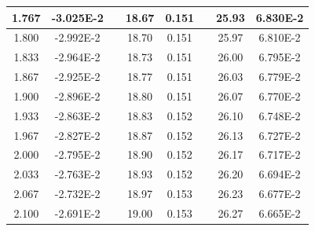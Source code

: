 \documentclass[article,12pt]{elsarticle}
\begin{document}
\begin{longtable}[c]{|c|c|cccccc}
1.767    & -3.025E-2 & \multicolumn{1}{c|}{} & \multicolumn{1}{c|}{18.67}   & \multicolumn{1}{c|}{0.151} & \multicolumn{1}{c|}{} & \multicolumn{1}{c|}{25.93}   & \multicolumn{1}{c|}{6.830E-2} \\ \hline
1.800    & -2.992E-2 & \multicolumn{1}{c|}{} & \multicolumn{1}{c|}{18.70}   & \multicolumn{1}{c|}{0.151} & \multicolumn{1}{c|}{} & \multicolumn{1}{c|}{25.97}   & \multicolumn{1}{c|}{6.810E-2} \\ \hline
1.833    & -2.964E-2 & \multicolumn{1}{c|}{} & \multicolumn{1}{c|}{18.73}   & \multicolumn{1}{c|}{0.151} & \multicolumn{1}{c|}{} & \multicolumn{1}{c|}{26.00}   & \multicolumn{1}{c|}{6.795E-2} \\ \hline
1.867    & -2.925E-2 & \multicolumn{1}{c|}{} & \multicolumn{1}{c|}{18.77}   & \multicolumn{1}{c|}{0.151} & \multicolumn{1}{c|}{} & \multicolumn{1}{c|}{26.03}   & \multicolumn{1}{c|}{6.779E-2} \\ \hline
1.900    & -2.896E-2 & \multicolumn{1}{c|}{} & \multicolumn{1}{c|}{18.80}   & \multicolumn{1}{c|}{0.151} & \multicolumn{1}{c|}{} & \multicolumn{1}{c|}{26.07}   & \multicolumn{1}{c|}{6.770E-2} \\ \hline
1.933    & -2.863E-2 & \multicolumn{1}{c|}{} & \multicolumn{1}{c|}{18.83}   & \multicolumn{1}{c|}{0.152} & \multicolumn{1}{c|}{} & \multicolumn{1}{c|}{26.10}   & \multicolumn{1}{c|}{6.748E-2} \\ \hline
1.967    & -2.827E-2 & \multicolumn{1}{c|}{} & \multicolumn{1}{c|}{18.87}   & \multicolumn{1}{c|}{0.152} & \multicolumn{1}{c|}{} & \multicolumn{1}{c|}{26.13}   & \multicolumn{1}{c|}{6.727E-2} \\ \hline
2.000    & -2.795E-2 & \multicolumn{1}{c|}{} & \multicolumn{1}{c|}{18.90}   & \multicolumn{1}{c|}{0.152} & \multicolumn{1}{c|}{} & \multicolumn{1}{c|}{26.17}   & \multicolumn{1}{c|}{6.717E-2} \\ \hline
2.033    & -2.763E-2 & \multicolumn{1}{c|}{} & \multicolumn{1}{c|}{18.93}   & \multicolumn{1}{c|}{0.152} & \multicolumn{1}{c|}{} & \multicolumn{1}{c|}{26.20}   & \multicolumn{1}{c|}{6.694E-2} \\ \hline
2.067    & -2.732E-2 & \multicolumn{1}{c|}{} & \multicolumn{1}{c|}{18.97}   & \multicolumn{1}{c|}{0.153} & \multicolumn{1}{c|}{} & \multicolumn{1}{c|}{26.23}   & \multicolumn{1}{c|}{6.677E-2} \\ \hline
2.100    & -2.691E-2 & \multicolumn{1}{c|}{} & \multicolumn{1}{c|}{19.00}   & \multicolumn{1}{c|}{0.153} & \multicolumn{1}{c|}{} & \multicolumn{1}{c|}{26.27}   & \multicolumn{1}{c|}{6.665E-2} \\ \hline

\end{longtable}
\end{document}
